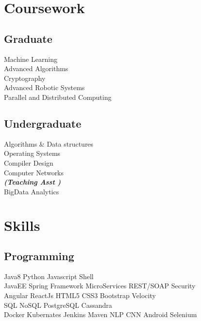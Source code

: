\documentclass[]{kk-resume-openfont}
\begin{document}
\begin{minipage}[t]{0.33\textwidth}

\section{Coursework}
\subsection{Graduate}
Machine Learning \\
Advanced Algorithms \\
Cryptography \\
Advanced Robotic Systems \\
Parallel and Distributed Computing \\
\sectionsep

\subsection{Undergraduate}
Algorithms \& Data structures \\
Operating Systems \\
Compiler Design \\
Computer Networks \\
{\footnotesize \textit{\textbf{(Teaching Asst ) }}} \\
BigData Analytics \\


\section{Skills}
\subsection{Programming}
Java8 \textbullet{}  Python \textbullet{} Javascript \textbullet{}  Shell\\
JavaEE \textbullet{} Spring Framework        
\textbullet{} MicroServices \textbullet{} REST/SOAP \textbullet{} Security\\ 
Angular \textbullet{} ReactJs \textbullet{} HTML5 \textbullet{} CSS3 \textbullet{} Bootstrap \textbullet{} Velocity\\
SQL \textbullet{} NoSQL \textbullet{} PostgreSQL\textbullet{} Cassandra\\
 Docker \textbullet{} Kubernates \textbullet{} Jenkins \textbullet{} Maven
 NLP\textbullet{} CNN \textbullet{} Android \textbullet{}  Selenium
\sectionsep

%
%

\end{minipage} 
\end{document}
